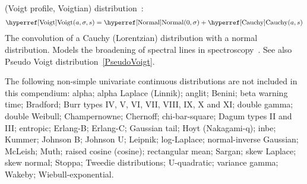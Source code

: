 \secbreak
{} (Voigt profile, Voigtian) distribution~\cite{Armstrong1967}:
\begin{align}
\label{Voigt}
\opr{Voigt}(a,\sigma,s) = \opr{Normal}(0,\sigma) + \opr{Cauchy}(a,s) \checked
\end{align}
The convolution of a Cauchy (Lorentzian) distribution with a normal distribution. Models the broadening of spectral lines in spectroscopy~\cite{Armstrong1967}. See also Pseudo Voigt distribution~\eqref{PseudoVoigt}.







The following non-simple univariate continuous distributions are not included in this compendium:
%
%
%
%
alpha;
alpha Laplace (Linnik);	%
anglit;				%
Benini;
beta warning time;
Bradford; 	%
Burr types IV, V, VI, VII, VIII, IX, X and XI;
double gamma; %
double Weibull; 
Champernowne;
Chernoff;
chi-bar-square;
Dagum types II and III;	%
entropic;
Erlang-B;
Erlang-C;
Gaussian tail;	%
Hoyt (Nakagami-q); %
inbe;
Kummer;
Johnson B;
Johnson U;
Leipnik;
log-Laplace;
normal-inverse Gaussian;
McLeish;			%
Muth;
raised cosine (cosine);
rectangular mean;
Sargan;								%
skew Laplace;
skew normal;
Stoppa;	%
Tweedie distributions;		
U-quadratic;				%
variance gamma; 
Wakeby;
Wiebull-exponential.



